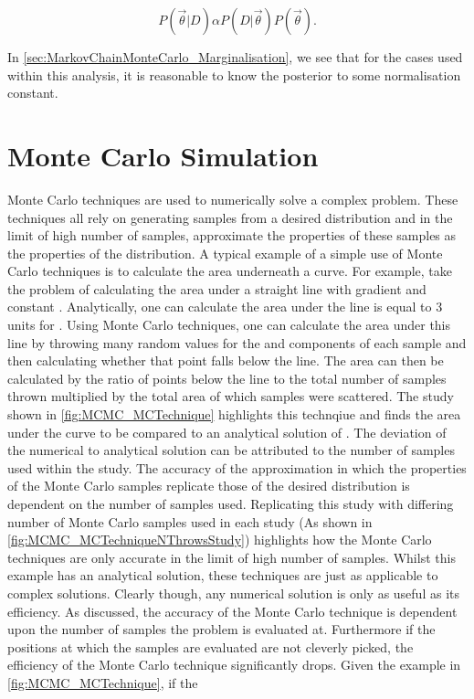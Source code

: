 \begin{equation}
  P(\vec{\theta}|D) \alpha P(D|\vec{\theta}) P(\vec{\theta}).
\end{equation}

In \autoref{sec:MarkovChainMonteCarlo_Marginalisation}, we see that for the cases used within this analysis, it is reasonable to know the posterior to some normalisation constant.

\section{Monte Carlo Simulation}
\label{sec:MarkovChainMonteCarlo_MonteCarloSimulation}
Monte Carlo techniques are used to numerically solve a complex problem. These techniques all rely on generating samples from a desired distribution and in the limit of high number of samples, approximate the properties of these samples as the properties of the distribution. A typical example of a simple use of Monte Carlo techniques is to calculate the area underneath a curve. For example, take the problem of calculating the area under a straight line with gradient  and constant . Analytically, one can calculate the area under the line is equal to 3 units for . Using Monte Carlo techniques, one can calculate the area under this line by throwing many random values for the  and  components of each sample and then calculating whether that point falls below the line. The area can then be calculated by the ratio of points below the line to the total number of samples thrown multiplied by the total area of which samples were scattered. The study shown in \autoref{fig:MCMC_MCTechnique} highlights this technqiue and finds the area under the curve to be  compared to an analytical solution of . The deviation of the numerical to analytical solution can be attributed to the number of samples used within the study. The accuracy of the approximation in which the properties of the Monte Carlo samples replicate those of the desired distribution is dependent on the number of samples used. Replicating this study with differing number of Monte Carlo samples used in each study (As shown in \autoref{fig:MCMC_MCTechniqueNThrowsStudy}) highlights how the Monte Carlo techniques are only accurate in the limit of high number of samples. Whilst this example has an analytical solution, these techniques are just as applicable to complex solutions. Clearly though, any numerical solution is only as useful as its efficiency. As discussed, the accuracy of the Monte Carlo technique is dependent upon the number of samples the problem is evaluated at. Furthermore if the positions at which the samples are evaluated are not cleverly picked, the efficiency of the Monte Carlo technique significantly drops. Given the example in \autoref{fig:MCMC_MCTechnique}, if the 